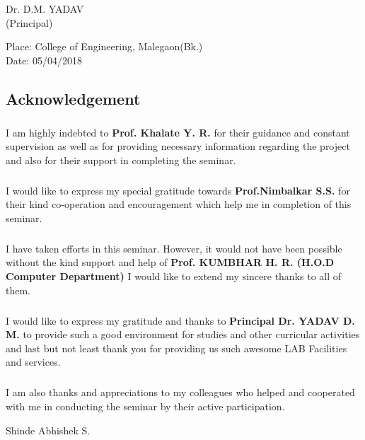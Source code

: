 \documentclass[12pt,a4paper]{report}
\begin{document}
 \begin{center}
   Dr. D.M. YADAV\\
   (Principal)
\end{center}
\vspace{0.2 in}
Place: College of Engineering, Malegaon(Bk.) \\
\hspace{0.1in} Date: 05/04/2018



	\newpage					%
		\pagestyle{empty}           %
		\begin{center}				%
				\section*{Acknowledgement}
				\vspace{.15 in}       %
		\end{center}

\begin{normalsize}
	{

	{\setlength{\baselineskip}{1.5\baselineskip}
	
	\subparagraph{}
	I am highly indebted to \textbf{Prof. Khalate Y. R.} for their guidance and constant supervision as well as for providing necessary information regarding the project and also for their support in completing the seminar.
	
\subparagraph{}
I would like to express my special gratitude  towards \textbf{Prof.Nimbalkar S.S.} for their kind co-operation and encouragement which help me in completion of this seminar.

\subparagraph{}
I have taken efforts in this seminar. However, it would not have been possible without the kind support and help of \textbf{Prof. KUMBHAR H. R. (H.O.D Computer Department)} I would like to extend my sincere thanks to all of them.

\subparagraph{}
I would like to express my gratitude and thanks to \textbf{Principal Dr. YADAV D. M.} to provide such a good environment for studies and other curricular activities and last but not least thank you for providing us such awesome LAB Facilities and services.

\subparagraph{}
I am also thanks and appreciations to my colleagues who helped and cooperated with me in conducting the seminar by their active participation.
		
	
	 \vspace{30mm}
	 
	\begin{flushright}
	Shinde Abhishek S.
	\end{flushright}
	}
	}

\end{normalsize}
\end{document}
